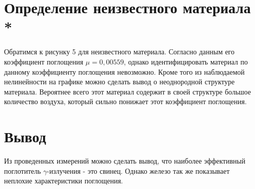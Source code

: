 \documentclass[12pt]{article}
\begin{document}
\section{Определение неизвестного материала *}

  Обратимся к рисунку 5 для неизвестного материала. Согласно данным его
  коэффициент поглощения $\mu = 0,00559$, однако идентифицировать материал по
  данному коэффициенту поглощения невозможно. Кроме того из наблюдаемой
  нелинейности на графике можно сделать вывод о неоднородной структуре
  материала. Вероятнее всего этот материал содержит в своей структуре большое
  количество воздуха, который сильно понижает этот коэффициент поглощения.

\section{Вывод}

  Из проведенных измерений можно сделать вывод, что наиболее эффективный
  поглотитель $\gamma$-излучения - это свинец. Однако железо так же показывает
  неплохие характеристики поглощения.
\end{document}
